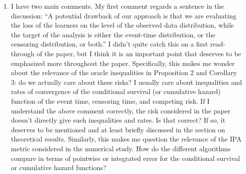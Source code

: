 \documentclass[a4paper,danish]{article}
\newcommand{\1}{\mathds{1}}
\newcommand{\answer}[1]{{\vspace{1em}{\bf #1}\vspace{1em}}}
\begin{document}
\begin{enumerate}
\item I have two main comments. My first comment regards a sentence in
the discussion: ``A potential drawback of our approach is that we
are evaluating the loss of the learners on the level of the
observed data distribution, while the target of the analysis is
either the event-time distribution, or the censoring distribution,
or both.” I didn’t quite catch this on a first read-through of the
paper, but I think it is an important point that deserves to be
emphasized more throughout the paper. Specifically, this makes me
wonder about the relevance of the oracle inequalities in
Proposition 2 and Corollary 3: do we actually care about these
risks? I usually care about inequalities and rates of convergence
of the conditional survival (or cumulative hazard) function of the
event time, censoring time, and competing risk. If I understand the
above comment correctly, the risk considered in the paper doesn’t
directly give such inequalities and rates. Is that correct? If so,
it deserves to be mentioned and at least briefly discussed in the
section on theoretical results. Similarly, this makes me question
the relevance of the IPA metric considered in the numerical
study. How do the different algorithms compare in terms of
pointwise or integrated error for the conditional survival or
cumulative hazard functions?
\end{enumerate}

\answer{

This is an important point, which we agree should be made clear
earlier in the paper. We have now added a paragraph at the end of
Section 5 (see below). We have also added a sentence to the discussion
in Section 8 (text in blue below) Finally, we note that the IPA in the
numerical studies was readily calculated for the conditional survival
function as you suggested. We have now made this clearer by updating
the corresponding paragraph in Section 6.
}
\end{document}
